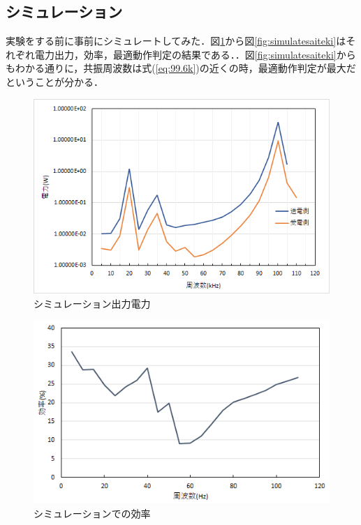 \documentclass[12pt]{jarticle}
\begin{document}
\subsection{シミュレーション}
実験をする前に事前にシミュレートしてみた．図\ref{fig:simulatew}から図\ref{fig:simulatesaiteki}はそれぞれ電力出力，効率，最適動作判定の結果である．．図\ref{fig:simulatesaiteki}からもわかる通りに，共振周波数は式(\ref{eq:99.6k})の近くの時，最適動作判定が最大だということが分かる．
 \begin{figure}[H]
	\centering
	\includegraphics[scale=1]{シミュレーション電力.png}
	\caption{シミュレーション出力電力}
	\label{fig:simulatew}
\end{figure}
 \begin{figure}[H]
	\centering
	\includegraphics[scale=1]{kouritusimu.png}
	\caption{シミュレーションでの効率}
	\label{fig:simulatekou}
\end{figure}
\end{document}
